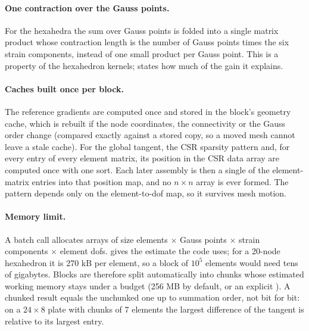 \paragraph{One contraction over the Gauss points.} For the hexahedra the sum over Gauss points is folded into a single matrix product whose contraction length is the number of Gauss points times the six strain components, instead of one small product per Gauss point. This is a property of the hexahedron kernels;  states how much of the gain it explains.

\paragraph{Caches built once per block.} The reference gradients are computed once and stored in the block's geometry cache, which is rebuilt if the node coordinates, the connectivity or the Gauss order change (compared exactly against a stored copy, so a moved mesh cannot leave a stale cache). For the global tangent, the CSR sparsity pattern and, for every entry of every element matrix, its position in the CSR data array are computed once with one sort. Each later assembly is then a single  of the element-matrix entries into that position map, and no $n\times n$ array is ever formed. The pattern depends only on the element-to-dof map, so it survives mesh motion.

\paragraph{Memory limit.} A batch call allocates arrays of size elements $\times$ Gauss points $\times$ strain components $\times$ element dofs.  gives the estimate the code uses; for a 20-node hexahedron it is 270 kB per element, so a block of $10^5$ elements would need tens of gigabytes. Blocks are therefore split automatically into chunks whose estimated working memory stays under a budget (256 MB by default, or an explicit ). A chunked result equals the unchunked one up to summation order, not bit for bit: on a $24\times8$ plate with chunks of 7 elements the largest difference of the tangent is \cbkChunkDiff{} relative to its largest entry.

\begin{table}[ht]
\centering\small

\caption{Estimated working memory of a batched tangent call (the dominant arrays, not the peak resident memory), from the package's own estimate.}\label{tab:bk-chunk}
\end{table}

